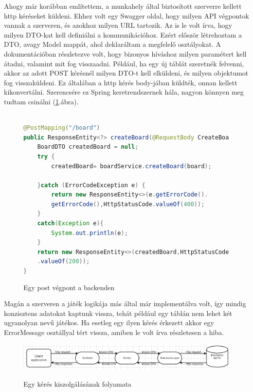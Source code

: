 \documentclass[a4paper,twoside]{article}
\begin{document}
Ahogy már korábban említettem, a munkahely által biztosított szerverre kellett http kéréseket
küldeni. Ehhez volt egy Swagger\cite{swagger} oldal, hogy milyen API végpontok vannak a szerveren, és
azokhoz milyen URL tartozik.  Az is le volt írva, hogy milyen DTO-kat kell definiálni a
kommunikációhoz. Ezért először létrehoztam a DTO, avagy Model mappát, ahol deklaráltam a
megfelelő osztályokat. A dokumentációban részletezve volt, hogy bizonyos híváshoz milyen
paramétert kell átadni, valamint mit fog visszaadni. Például, ha egy új táblát szeretnék
felvenni, akkor az adott POST kérésnél milyen DTO-t kell elküldeni, és milyen objektumot
fog visszaküldeni. Ez általában a http kérés body-jában küldték, onnan kellett kikonvertálni. Szerencsére ez Spring keretrendszernek hála, nagyon könnyen meg tudtam csinálni (\ref{post-vegpont}.ábra).
\begin{figure}
	\caption{Egy post végpont a backenden}
	

	\begin{minipage}{\textwidth}
	\begin{lstlisting}[language=java,breaklines=true]
		
@PostMapping("/board")
public ResponseEntity<?> createBoard(@RequestBody CreateBoardDTO board) {
	BoardDTO createdBoard = null;
	try {
		createdBoard= boardService.createBoard(board);
		
	}catch (ErrorCodeException e) {
		return new ResponseEntity<>(e.getErrorCode().
		getErrorCode(),HttpStatusCode.valueOf(400));
	}
	catch(Exception e){
		System.out.println(e);
	}
	return new ResponseEntity<>(createdBoard,HttpStatusCode
	.valueOf(200));
}
	\end{lstlisting}
\end{minipage}

	\label{post-vegpont}
\end{figure} 

Magán a szerveren a játék logikája más által már implementálva volt, így mindig
konzisztens adatokat kaptunk vissza, tehát például egy táblán nem lehet két ugyanolyan nevű
játékos. Ha esetleg egy ilyen kérés érkezett akkor egy ErrorMessage osztállyal tért vissza,
amiben le volt írva részletesen a hiba.

\begin{figure}
	\caption{Egy kérés kiszolgálásának folyamata}
	\raggedleft 
	\includegraphics[scale=0.45]{backend-pipeline}
	\label{backend-pipeline}
\end{figure}
\end{document}
